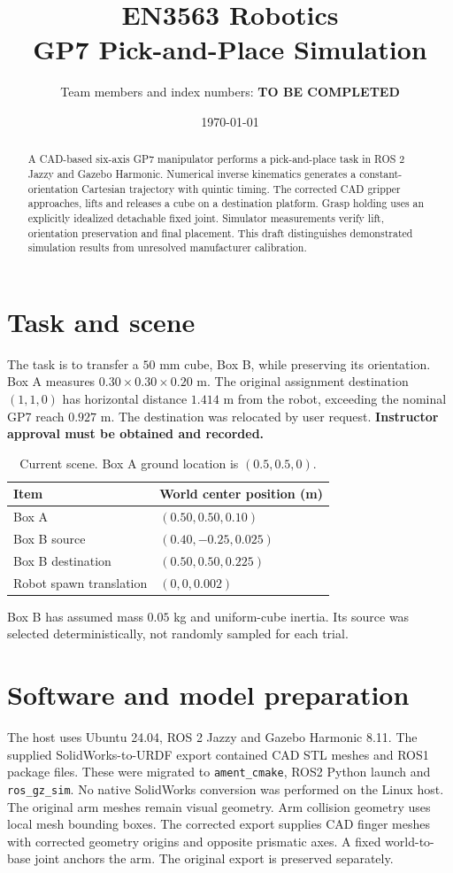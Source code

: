 \documentclass[11pt,a4paper]{article}
\title{EN3563 Robotics\\GP7 Pick-and-Place Simulation}
\author{Team members and index numbers: \textbf{TO BE COMPLETED}}
\date{\today}
\begin{document}
\maketitle
\begin{abstract}
A CAD-based six-axis GP7 manipulator performs a pick-and-place task in ROS 2 Jazzy and Gazebo Harmonic. Numerical inverse kinematics generates a constant-orientation Cartesian trajectory with quintic timing. The corrected CAD gripper approaches, lifts and releases a cube on a destination platform. Grasp holding uses an explicitly idealized detachable fixed joint. Simulator measurements verify lift, orientation preservation and final placement. This draft distinguishes demonstrated simulation results from unresolved manufacturer calibration.
\end{abstract}
\section{Task and scene}
The task is to transfer a $50$ mm cube, Box B, while preserving its orientation. Box A measures $0.30\times0.30\times0.20$ m. The original assignment destination $(1,1,0)$ has horizontal distance $1.414$ m from the robot, exceeding the nominal GP7 reach $0.927$ m. The destination was relocated by user request. \textbf{Instructor approval must be obtained and recorded.}
\begin{table}[h]\centering
\begin{tabular}{ll}\toprule Item & World center position (m)\\\midrule
Box A & $(0.50,0.50,0.10)$\\
Box B source & $(0.40,-0.25,0.025)$\\
Box B destination & $(0.50,0.50,0.225)$\\
Robot spawn translation & $(0,0,0.002)$\\\bottomrule\end{tabular}
\caption{Current scene. Box A ground location is $(0.5,0.5,0)$.}
\end{table}
Box B has assumed mass $0.05$ kg and uniform-cube inertia. Its source was selected deterministically, not randomly sampled for each trial.
\section{Software and model preparation}
The host uses Ubuntu 24.04, ROS 2 Jazzy and Gazebo Harmonic 8.11. The supplied SolidWorks-to-URDF export contained CAD STL meshes and ROS1 package files. These were migrated to \texttt{ament\_cmake}, ROS2 Python launch and \texttt{ros\_gz\_sim}. No native SolidWorks conversion was performed on the Linux host.
The original arm meshes remain visual geometry. Arm collision geometry uses local mesh bounding boxes. The corrected export supplies CAD finger meshes with corrected geometry origins and opposite prismatic axes. A fixed world-to-base joint anchors the arm. The original export is preserved separately.
\end{document}
